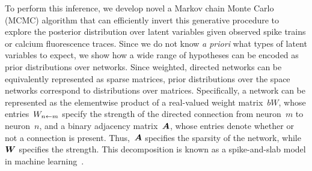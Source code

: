 To perform this inference, we develop novel a Markov chain Monte Carlo (MCMC)
algorithm that can efficiently invert this generative procedure 
to explore the posterior distribution over 
latent variables given observed spike trains or calcium fluorescence traces. 
Since we do not know \textit{a priori} what types of latent variables to expect, 
we show how a wide range of hypotheses can be encoded as prior distributions 
over networks. Since weighted, directed networks can be equivalently represented 
as sparse matrices, prior distributions over the space networks correspond 
to distributions over matrices. Specifically, a network can be represented 
as the elementwise product of a real-valued weight matrix~$bW$, whose 
entries~$W_{n \leftarrow m}$ specify the strength of the directed connection from 
neuron~$m$ to neuron~$n$, and a binary adjacency matrix~$\boldsymbol{A}$, whose 
entries denote whether or not a connection is present. Thus,~$\boldsymbol{A}$ specifies 
the sparsity of the network, while~$\boldsymbol{W}$ specifies the strength. This 
decomposition is known as a spike-and-slab model in machine 
learning~\cite{Mitchell1988}.

